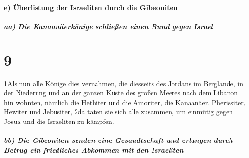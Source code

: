 \hypertarget{e-uxfcberlistung-der-israeliten-durch-die-gibeoniten}{%
\paragraph{e) Überlistung der Israeliten durch die
Gibeoniten}\label{e-uxfcberlistung-der-israeliten-durch-die-gibeoniten}}

\hypertarget{aa-die-kanaanuxe4erkuxf6nige-schlieuxdfen-einen-bund-gegen-israel}{%
\subparagraph{aa) Die Kanaanäerkönige schließen einen Bund gegen
Israel}\label{aa-die-kanaanuxe4erkuxf6nige-schlieuxdfen-einen-bund-gegen-israel}}

\hypertarget{section-8}{%
\section{9}\label{section-8}}

1Als nun alle Könige dies vernahmen, die diesseits des Jordans im
Berglande, in der Niederung und an der ganzen Küste des großen Meeres
nach dem Libanon hin wohnten, nämlich die Hethiter und die Amoriter, die
Kanaanäer, Pherissiter, Hewiter und Jebusiter, 2da taten sie sich alle
zusammen, um einmütig gegen Josua und die Israeliten zu kämpfen.

\hypertarget{bb-die-gibeoniten-senden-eine-gesandtschaft-und-erlangen-durch-betrug-ein-friedliches-abkommen-mit-den-israeliten}{%
\subparagraph{bb) Die Gibeoniten senden eine Gesandtschaft und erlangen
durch Betrug ein friedliches Abkommen mit den
Israeliten}\label{bb-die-gibeoniten-senden-eine-gesandtschaft-und-erlangen-durch-betrug-ein-friedliches-abkommen-mit-den-israeliten}}

